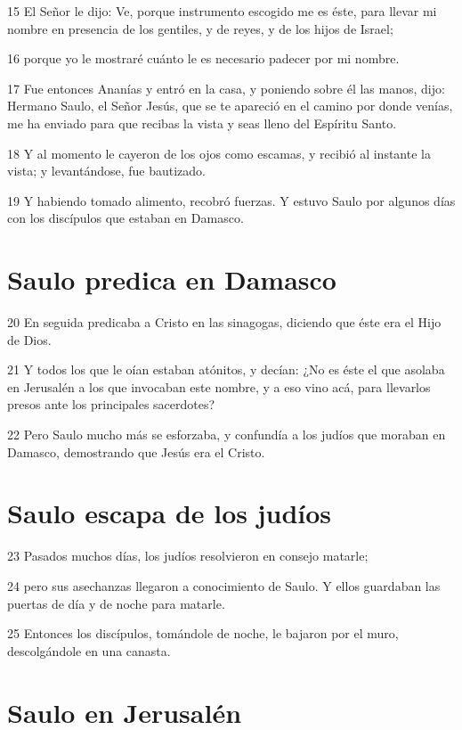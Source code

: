 \par 15 El Señor le dijo: Ve, porque instrumento escogido me es éste, para llevar mi nombre en presencia de los gentiles, y de reyes, y de los hijos de Israel;
\par 16 porque yo le mostraré cuánto le es necesario padecer por mi nombre.
\par 17 Fue entonces Ananías y entró en la casa, y poniendo sobre él las manos, dijo: Hermano Saulo, el Señor Jesús, que se te apareció en el camino por donde venías, me ha enviado para que recibas la vista y seas lleno del Espíritu Santo.
\par 18 Y al momento le cayeron de los ojos como escamas, y recibió al instante la vista; y levantándose, fue bautizado.
\par 19 Y habiendo tomado alimento, recobró fuerzas. Y estuvo Saulo por algunos días con los discípulos que estaban en Damasco.

\section*{Saulo predica en Damasco}

\par 20 En seguida predicaba a Cristo en las sinagogas, diciendo que éste era el Hijo de Dios.
\par 21 Y todos los que le oían estaban atónitos, y decían: ¿No es éste el que asolaba en Jerusalén a los que invocaban este nombre, y a eso vino acá, para llevarlos presos ante los principales sacerdotes?
\par 22 Pero Saulo mucho más se esforzaba, y confundía a los judíos que moraban en Damasco, demostrando que Jesús era el Cristo.

\section*{Saulo escapa de los judíos}

\par 23 Pasados muchos días, los judíos resolvieron en consejo matarle;
\par 24 pero sus asechanzas llegaron a conocimiento de Saulo. Y ellos guardaban las puertas de día y de noche para matarle.
\par 25 Entonces los discípulos, tomándole de noche, le bajaron por el muro, descolgándole en una canasta.

\section*{Saulo en Jerusalén}

